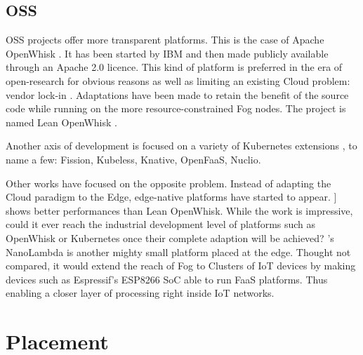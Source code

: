\documentclass[11pt]{sdm}
\begin{document}
%    

\hypersetup{linkcolor=}
\subsection{\acrfull{OSS}}
\gls{OSS} projects offer more transparent platforms. This is the case of Apache OpenWhisk \cite{noauthor_apache_nodate}. It has been started by IBM and then made publicly available through an Apache 2.0 licence. This kind of platform is preferred in the era of open-research for obvious reasons as well as limiting an existing Cloud problem: vendor lock-in \cite{kjorveziroski_iot_2021}. Adaptations have been made to retain the benefit of the source code while running on the more resource-constrained Fog nodes. The project is named Lean OpenWhisk \cite{breitgand_lean_2018}.

Another axis of development is focused on a variety of Kubernetes extensions \cite{bocci_secure_2021}, to name a few: Fission, Kubeless, Knative, OpenFaaS, Nuclio.

Other works have focused on the opposite problem. Instead of adapting the Cloud paradigm to the Edge, edge-native platforms have started to appear. \citet{pfandzelter_tinyfaas_2020}] shows better performances than Lean OpenWhisk. While the work is impressive, could it ever reach the industrial development level of platforms such as OpenWhisk or Kubernetes once their complete adaption will be achieved? 's NanoLambda is another mighty small platform placed at the edge. Thought not compared, it would extend the reach of Fog to Clusters of IoT devices by making devices such as Espressif's ESP8266 \gls{SoC} \cite{noauthor_esp8266_nodate} able to run \gls{FaaS} platforms. Thus enabling a closer layer of processing right inside IoT networks.

\section{Placement}
\end{document}
